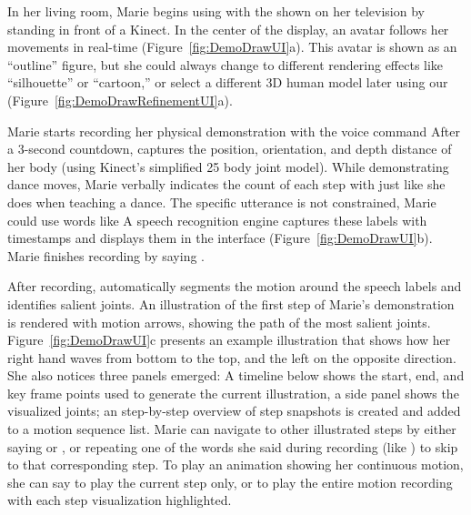 In her living room, Marie begins using \systemname{} with the \phaseI{} shown on her television by standing in front of a Kinect. In the center of the display, an avatar follows her movements in real-time (Figure~\ref{fig:DemoDrawUI}a).
This avatar is shown as an ``outline'' figure, but she could always change to different rendering effects like ``silhouette'' or ``cartoon,'' or select a different 3D human model later using our \phaseII{} (Figure~\ref{fig:DemoDrawRefinementUI}a).


Marie starts recording her physical demonstration with the voice command  After a 3-second countdown, \systemname{} captures the position, orientation, and depth distance of her body (using Kinect's simplified 25 body joint model).
%
While demonstrating dance moves, Marie verbally indicates the count of each step with  just like she does when teaching a dance. The specific utterance is not constrained, Marie could use words like  A speech recognition engine captures these labels with timestamps and displays them in the interface (Figure~\ref{fig:DemoDrawUI}b).
Marie finishes recording by saying .

After recording, \systemname{} automatically segments the motion around the speech labels and identifies salient joints. An illustration of the first step of Marie's demonstration is rendered with motion arrows, showing the path of the most salient joints. Figure~\ref{fig:DemoDrawUI}c presents an example illustration that shows how her right hand waves from bottom to the top, and the left on the opposite direction. She also notices three panels emerged: A timeline below shows the start, end, and key frame points used to generate the current illustration, a side panel shows the visualized joints; an step-by-step overview of step snapshots is created and added to a motion sequence list.
%
Marie can navigate to other illustrated steps by either saying  or , or repeating one of the words she said during recording (like ) to skip to that corresponding step. To play an animation showing her continuous motion, she can say  to play the current step only, or  to play the entire motion recording with each step visualization highlighted.

